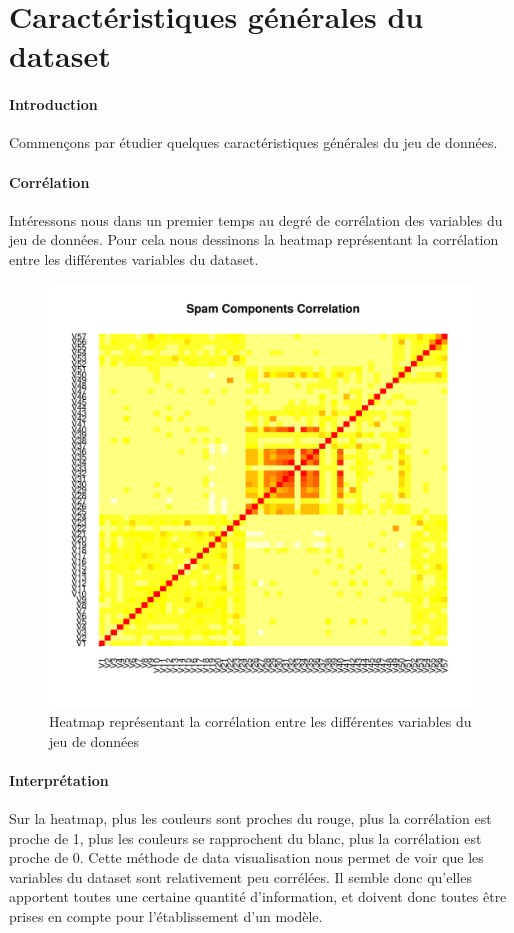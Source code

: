 \documentclass{report}
\begin{document}
\section{Caractéristiques générales du dataset}
\paragraph{Introduction}
Commençons par étudier quelques caractéristiques générales du jeu de données.

\paragraph{Corrélation}
Intéressons nous dans un premier temps au degré de corrélation des variables du jeu de données. Pour cela nous dessinons la heatmap représentant la corrélation entre les différentes variables du dataset.

\begin{figure}[ht!]
\begin{center}
    \includegraphics[width=\textwidth]{component_cor.pdf}
    \caption{Heatmap représentant la corrélation entre les différentes variables du jeu de données}
\end{center}
\end{figure}

\clearpage
\paragraph{Interprétation}
Sur la heatmap, plus les couleurs sont proches du rouge, plus la corrélation est proche de 1, plus les couleurs se rapprochent du blanc, plus la corrélation est proche de 0. Cette méthode de data visualisation nous permet de voir que les variables du dataset sont relativement peu corrélées. Il semble donc qu'elles apportent toutes une certaine quantité d'information, et doivent donc toutes être prises en compte pour l'établissement d'un modèle.
\end{document}
